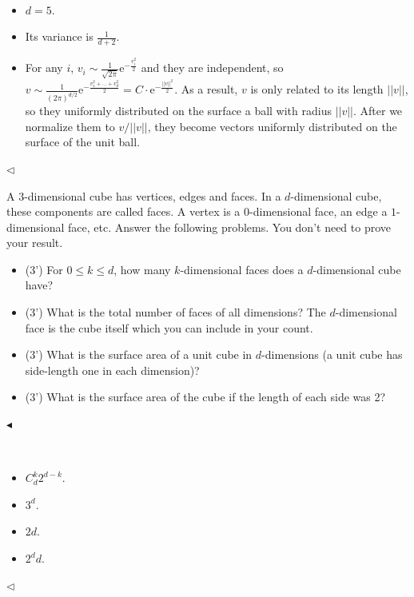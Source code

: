 \documentclass[11pt]{article}
\newenvironment{problem}[2][Problem]{\begin{trivlist}
\item[\hskip \labelsep {\bfseries #1}\hskip \labelsep {\bfseries #2.}]}{\hfill$\blacktriangleleft$\end{trivlist}}
\newenvironment{answer}[1][Answer]{\begin{trivlist}
\item[\hskip \labelsep {\bfseries #1.}\hskip \labelsep]}{\hfill$\lhd$\end{trivlist}}
\newcommand\e{\mathrm{e}}
\begin{document}
\begin{answer} ~
\begin{itemize}
    \item [(1)] $d = 5$.
    \item [(2)] Its variance is $\frac{1}{d+2}$.
    \item [(3)] For any $i$, $v_i \sim \frac{1}{\sqrt{2\pi}}{\e}^{-\frac{v_i^2}{2}}$ and they are independent, so $v \sim \frac{1}{(2\pi)^{d/2}} {\e}^{-\frac{v_1^2 + \dots + v_d^2}{2}} = C \cdot {\e}^{-\frac{||v||^2}{2}}$. As a result, $v$ is only related to its length $||v||$, so they uniformly distributed on the surface a ball with radius $||v||$. After we normalize them to $v/||v||$, they become vectors uniformly distributed on the surface of the unit ball.
\end{itemize}
\end{answer}



\begin{problem}{6 (12')}
A 3-dimensional cube has vertices, edges and faces. In a $d$-dimensional cube, these components are called faces. A vertex is a $0$-dimensional face, an edge a $1$-dimensional face, etc. Answer the following problems. You don't need to prove your result.
\begin{itemize}
    \item [(1)] (3') For $0\leq k\leq d$, how many $k$-dimensional faces does a $d$-dimensional cube have?
    \item [(2)] (3') What is the total number of faces of all dimensions? The $d$-dimensional face is the cube itself which you can include in your count.
    \item [(3)] (3') What is the surface area of a unit cube in $d$-dimensions (a unit cube has side-length one in each dimension)?
    \item [(4)] (3') What is the surface area of the cube if the length of each side was 2?
\end{itemize}
\end{problem}

\begin{answer} ~
\begin{itemize}
    \item [(1)] $C_d^k 2^{d-k}$.
    \item [(2)] $3^d$.
    \item [(3)] $2d$. 
    \item [(4)] $2^dd$.
\end{itemize}
\end{answer}
\end{document}
